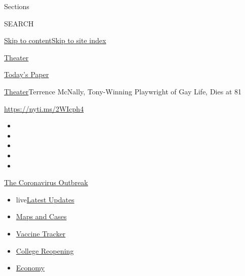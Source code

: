 Sections

SEARCH

\protect\hyperlink{site-content}{Skip to
content}\protect\hyperlink{site-index}{Skip to site index}

\href{https://www.nytimes3xbfgragh.onion/section/theater}{Theater}

\href{https://myaccount.nytimes3xbfgragh.onion/auth/login?response_type=cookie\&client_id=vi}{}

\href{https://www.nytimes3xbfgragh.onion/section/todayspaper}{Today's
Paper}

\href{/section/theater}{Theater}\textbar{}Terrence McNally, Tony-Winning
Playwright of Gay Life, Dies at 81

\url{https://nyti.ms/2WIcph4}

\begin{itemize}
\item
\item
\item
\item
\item
\end{itemize}

\href{https://www.nytimes3xbfgragh.onion/news-event/coronavirus?action=click\&pgtype=Article\&state=default\&region=TOP_BANNER\&context=storylines_menu}{The
Coronavirus Outbreak}

\begin{itemize}
\tightlist
\item
  live\href{https://www.nytimes3xbfgragh.onion/2020/08/04/world/coronavirus-covid-19.html?action=click\&pgtype=Article\&state=default\&region=TOP_BANNER\&context=storylines_menu}{Latest
  Updates}
\item
  \href{https://www.nytimes3xbfgragh.onion/interactive/2020/us/coronavirus-us-cases.html?action=click\&pgtype=Article\&state=default\&region=TOP_BANNER\&context=storylines_menu}{Maps
  and Cases}
\item
  \href{https://www.nytimes3xbfgragh.onion/interactive/2020/science/coronavirus-vaccine-tracker.html?action=click\&pgtype=Article\&state=default\&region=TOP_BANNER\&context=storylines_menu}{Vaccine
  Tracker}
\item
  \href{https://www.nytimes3xbfgragh.onion/2020/08/02/us/covid-college-reopening.html?action=click\&pgtype=Article\&state=default\&region=TOP_BANNER\&context=storylines_menu}{College
  Reopening}
\item
  \href{https://www.nytimes3xbfgragh.onion/live/2020/08/03/business/stock-market-today-coronavirus?action=click\&pgtype=Article\&state=default\&region=TOP_BANNER\&context=storylines_menu}{Economy}
\end{itemize}


